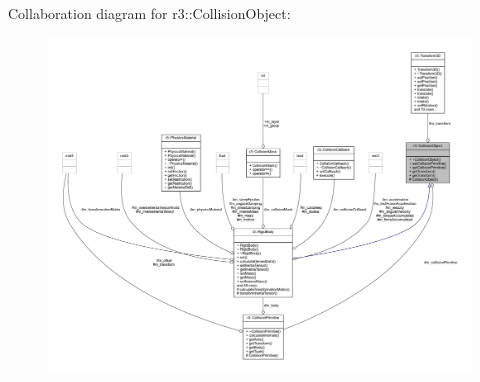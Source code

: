 Collaboration diagram for r3\+:\+:Collision\+Object\+:\nopagebreak
\begin{figure}[H]
\begin{center}
\leavevmode
\includegraphics[width=350pt]{classr3_1_1_collision_object__coll__graph}
\end{center}
\end{figure}
